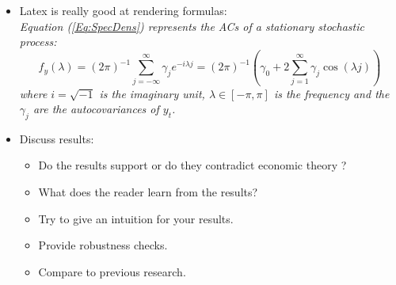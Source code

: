 \begin{itemize}
    \item Latex is really good at rendering formulas:\\
        {\it Equation (\ref{Eq:SpecDens}) represents the ACs of a stationary
        stochastic process:
        \begin{equation}
            f_y(\lambda) = (2\pi)^{-1} \sum_{j=-\infty}^{\infty}
                           \gamma_j e^{-i\lambda j}
                         =(2\pi)^{-1}\left(\gamma_0 + 2 \sum_{j=1}^{\infty}
        \gamma_j \cos(\lambda j)\right)
                                        \label{Eq:SpecDens}
        \end{equation}
        where $i=\sqrt{-1}$ is the imaginary unit, $\lambda \in [-\pi,
        \pi]$ is the frequency and the $\gamma_j$ are the autocovariances
        of $y_t$.}

\newpage

    \item Discuss results:
        \begin{itemize}
            \item Do the results support or do they contradict economic theory ?
            \item What does the reader learn from the results?
            \item Try to give an intuition for your results.
            \item Provide robustness checks.
            \item Compare to previous research.
        \end{itemize}
\end{itemize}
